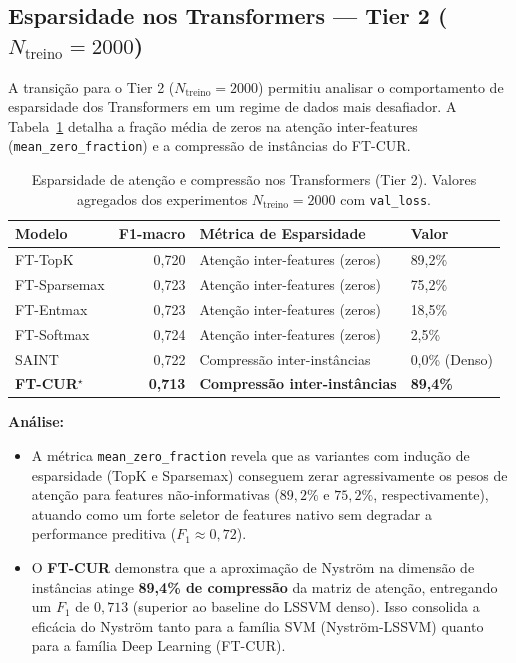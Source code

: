 \documentclass[12pt,a4paper]{article}
\begin{document}
\subsection{Esparsidade nos Transformers --- Tier 2 ($N_{\text{treino}}=2000$)}

A transição para o Tier 2 ($N_{\text{treino}}=2000$) permitiu analisar o comportamento de esparsidade dos Transformers em um regime de dados mais desafiador. A Tabela~\ref{tab:sparsity_ft_tier2} detalha a fração média de zeros na atenção inter-features (\texttt{mean\_zero\_fraction}) e a compressão de instâncias do FT-CUR.

\begin{table}[H]
\centering
\caption{Esparsidade de atenção e compressão nos Transformers (Tier 2). Valores agregados dos experimentos $N_{\text{treino}}=2000$ com \texttt{val\_loss}.}
\label{tab:sparsity_ft_tier2}
\begin{tabular}{lrll}
\toprule
\textbf{Modelo} & \textbf{F1-macro} & \textbf{Métrica de Esparsidade} & \textbf{Valor} \\
\midrule
FT-TopK & 0,720 & Atenção inter-features (zeros) & 89,2\% \\
FT-Sparsemax & 0,723 & Atenção inter-features (zeros) & 75,2\% \\
FT-Entmax & 0,723 & Atenção inter-features (zeros) & 18,5\% \\
FT-Softmax & 0,724 & Atenção inter-features (zeros) & 2,5\% \\
\midrule
SAINT & 0,722 & Compressão inter-instâncias & 0,0\% (Denso) \\
\textbf{FT-CUR$^\star$} & \textbf{0,713} & \textbf{Compressão inter-instâncias} & \textbf{89,4\%} \\
\bottomrule
\end{tabular}
\end{table}

\textbf{Análise:}
\begin{itemize}
  \item A métrica \texttt{mean\_zero\_fraction} revela que as variantes com indução de esparsidade (TopK e Sparsemax) conseguem zerar agressivamente os pesos de atenção para features não-informativas ($89{,}2\%$ e $75{,}2\%$, respectivamente), atuando como um forte seletor de features nativo sem degradar a performance preditiva ($F_1 \approx 0{,}72$).
  \item O \textbf{FT-CUR} demonstra que a aproximação de Nyström na dimensão de instâncias atinge \textbf{89,4\% de compressão} da matriz de atenção, entregando um $F_1$ de $0{,}713$ (superior ao baseline do LSSVM denso). Isso consolida a eficácia do Nyström tanto para a família SVM (Nyström-LSSVM) quanto para a família Deep Learning (FT-CUR).
\end{itemize}
\end{document}
